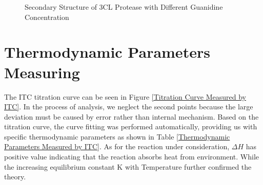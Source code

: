 \documentclass{report}
\begin{document}
 \begin{figure}
    \centering
    \caption{Secondary Structure of 3CL Protease with Different Guanidine Concentration}  
    \label{Secondary Structure of 3CL Protease}
 \end{figure}
\section{Thermodynamic Parameters Measuring}
The ITC  titration curve can be seen in Figure \ref{Titration Curve Measured by ITC}.
In the process of analysis, we neglect the second points because the large deviation must be caused by error rather than internal mechanism.
Based on the titration curve, the curve fitting was performed automatically, providing us with specific thermodynamic parameters as shown in Table \ref{Thermodynamic Parameters Measured by ITC}.
As for the reaction under consideration, $\Delta H$ has positive value indicating that the reaction absorbs heat from environment.
While the increasing equilibrium constant K with Temperature further confirmed the theory.
\end{document}
